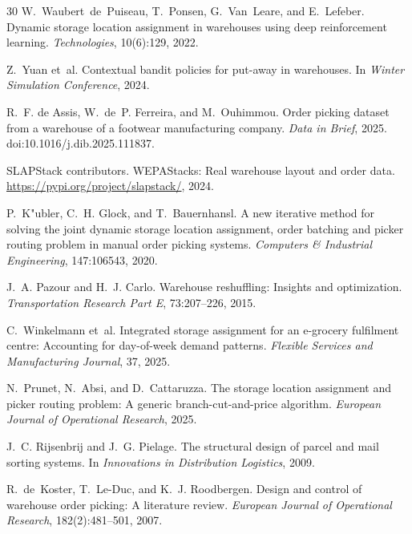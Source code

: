 \documentclass[11pt,a4paper]{article}
\begin{document}
\begin{thebibliography}{30}
W.~Waubert~de~Puiseau, T.~Ponsen, G.~Van~Leare, and E.~Lefeber.
\newblock Dynamic storage location assignment in warehouses using deep
  reinforcement learning.
\newblock \emph{Technologies}, 10(6):129, 2022.

Z.~Yuan et~al.
\newblock Contextual bandit policies for put-away in warehouses.
\newblock In \emph{Winter Simulation Conference}, 2024.

R.~F. de Assis, W.~de~P. Ferreira, and M.~Ouhimmou.
\newblock Order picking dataset from a warehouse of a footwear manufacturing
company.
\newblock \emph{Data in Brief}, 2025. doi:10.1016/j.dib.2025.111837.

SLAPStack contributors.
\newblock WEPAStacks: Real warehouse layout and order data.
\newblock \url{https://pypi.org/project/slapstack/}, 2024.

P.~K{"u}bler, C.~H. Glock, and T.~Bauernhansl.
\newblock A new iterative method for solving the joint dynamic storage
  location assignment, order batching and picker routing problem in
  manual order picking systems.
\newblock \emph{Computers \& Industrial Engineering}, 147:106543, 2020.

J.~A. Pazour and H.~J. Carlo.
\newblock Warehouse reshuffling: Insights and optimization.
\newblock \emph{Transportation Research Part E}, 73:207--226, 2015.

C.~Winkelmann et~al.
\newblock Integrated storage assignment for an e-grocery fulfilment centre:
  Accounting for day-of-week demand patterns.
\newblock \emph{Flexible Services and Manufacturing Journal}, 37, 2025.

N.~Prunet, N.~Absi, and D.~Cattaruzza.
\newblock The storage location assignment and picker routing problem: A
  generic branch-cut-and-price algorithm.
\newblock \emph{European Journal of Operational Research}, 2025.

J.~C. Rijsenbrij and J.~G. Pielage.
\newblock The structural design of parcel and mail sorting systems.
\newblock In \emph{Innovations in Distribution Logistics}, 2009.

R.~de~Koster, T.~Le-Duc, and K.~J. Roodbergen.
\newblock Design and control of warehouse order picking: A literature
  review.
\newblock \emph{European Journal of Operational Research}, 182(2):481--501,
  2007.


\end{thebibliography}
\end{document}
